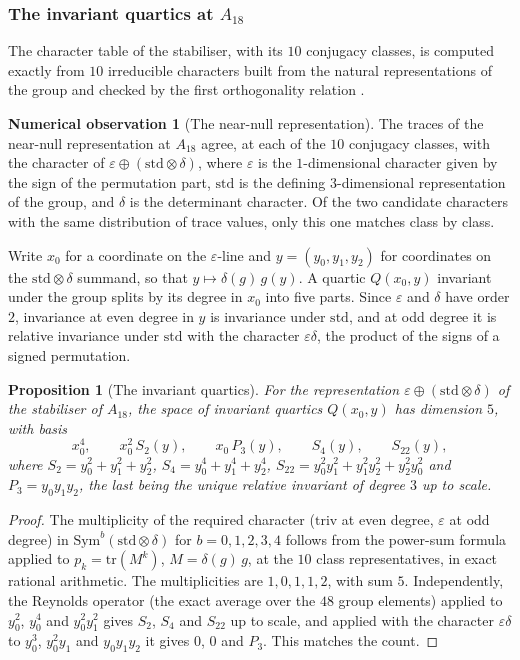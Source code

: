 \documentclass[11pt,reqno]{amsart}
\renewcommand{\_}{\origunderscore\allowbreak}
\numberwithin{equation}{section}
\theoremstyle{plain}
\newtheorem{prop}[thm]{Proposition}
\theoremstyle{definition}
\newtheorem{numobs}[thm]{Numerical observation}
\theoremstyle{remark}
\begin{document}
\subsubsection{The invariant quartics at \texorpdfstring{$A_{18}$}{A18}}\label{sec:a18-invariant-quartics}

The character table of the stabiliser, with its $10$ conjugacy classes,
is computed exactly from $10$ irreducible characters built from the
natural representations of the group and checked by the first
orthogonality relation \cite[\S2.3]{Ser77}.

\begin{numobs}[The near-null representation]\label{prop:a18-nullspace-irrep}
The traces of the near-null representation at $A_{18}$ agree, at each
of the $10$ conjugacy classes, with the character of
$\varepsilon\oplus(\mathrm{std}\otimes\delta)$, where $\varepsilon$ is
the $1$-dimensional character given by the sign of the permutation part,
$\mathrm{std}$ is the defining $3$-dimensional representation of the
group, and $\delta$ is the determinant character. Of the two candidate
characters with the same distribution of trace values, only this one
matches class by class.
\end{numobs}

Write $x_0$ for a coordinate on the $\varepsilon$-line and
$y=(y_0,y_1,y_2)$ for coordinates on the $\mathrm{std}\otimes\delta$
summand, so that $y\mapsto\delta(g)\,g(y)$. A quartic $Q(x_0,y)$
invariant under the group splits by its degree in $x_0$ into five parts.
Since $\varepsilon$ and $\delta$ have order $2$, invariance at even
degree in $y$ is invariance under $\mathrm{std}$, and at odd degree it
is relative invariance under $\mathrm{std}$ with the character
$\varepsilon\delta$, the product of the signs of a signed permutation.

\begin{prop}[The invariant quartics]\label{prop:a18-invariant-dim}
For the representation $\varepsilon\oplus(\mathrm{std}\otimes\delta)$
of the stabiliser of $A_{18}$, the space of invariant quartics
$Q(x_0,y)$ has dimension $5$, with basis
\[
  x_0^4,\qquad x_0^2\,S_2(y),\qquad x_0\,P_3(y),\qquad S_4(y),\qquad S_{22}(y),
\]
where $S_2=y_0^2+y_1^2+y_2^2$, $S_4=y_0^4+y_1^4+y_2^4$,
$S_{22}=y_0^2y_1^2+y_1^2y_2^2+y_2^2y_0^2$ and $P_3=y_0y_1y_2$, the last
being the unique relative invariant of degree $3$ up to scale.
\end{prop}

\begin{proof}
The multiplicity of the required character ($\mathrm{triv}$ at even
degree, $\varepsilon$ at odd degree) in $\mathrm{Sym}^b(\mathrm{std}\otimes\delta)$
for $b=0,1,2,3,4$ follows from the power-sum formula applied to
$p_k=\mathrm{tr}(M^k)$, $M=\delta(g)\,g$, at the $10$ class
representatives, in exact rational arithmetic. The multiplicities are
$1,0,1,1,2$, with sum $5$. Independently, the Reynolds operator
(the exact average over the $48$ group elements) applied to $y_0^2$,
$y_0^4$ and $y_0^2y_1^2$ gives $S_2$, $S_4$ and $S_{22}$ up to scale,
and applied with the character $\varepsilon\delta$ to $y_0^3$, $y_0^2y_1$ and
$y_0y_1y_2$ it gives $0$, $0$ and $P_3$. This matches the count.
\end{proof}
\end{document}
